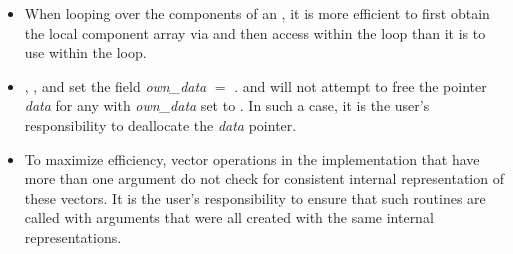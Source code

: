 \begin{itemize}
                                        
\item
  When looping over the components of an  , it is     
  more efficient to first obtain the local component array via       
   and then access  within the     
  loop than it is to use  within the loop.        
                                                               
\item
  {\warn} , , 
  and  set the field 
  {\em own\_data} $=$ . 
   and 
  will not attempt to free the pointer {\em data} for any  with
  {\em own\_data} set to . In such a case, it is the user's responsibility to
  deallocate the {\em data} pointer.

\item
  {\warn} To maximize efficiency, vector operations in the {\nvecp} implementation
  that have more than one  argument do not check for
  consistent internal representation of these vectors. It is the user's 
  responsibility to ensure that such routines are called with 
  arguments that were all created with the same internal representations.

\end{itemize}


